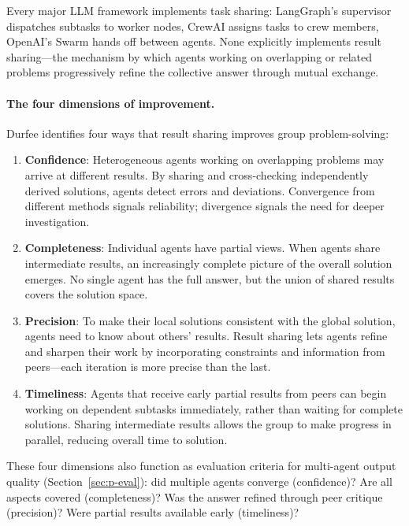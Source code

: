 \documentclass{article}
\begin{document}
Every major LLM framework implements task sharing: LangGraph's supervisor dispatches
subtasks to worker nodes, CrewAI assigns tasks to crew members, OpenAI's Swarm hands
off between agents. None explicitly implements result sharing---the mechanism by which
agents working on overlapping or related problems progressively refine the collective
answer through mutual exchange.

\paragraph{The four dimensions of improvement.}
Durfee identifies four ways that result sharing improves group problem-solving:

\begin{enumerate}[nosep]
  \item \textbf{Confidence}: Heterogeneous agents working on overlapping problems may
    arrive at different results. By sharing and cross-checking independently derived
    solutions, agents detect errors and deviations. Convergence from different methods
    signals reliability; divergence signals the need for deeper investigation.
  \item \textbf{Completeness}: Individual agents have partial views. When agents share
    intermediate results, an increasingly complete picture of the overall solution
    emerges. No single agent has the full answer, but the union of shared results
    covers the solution space.
  \item \textbf{Precision}: To make their local solutions consistent with the global
    solution, agents need to know about others' results. Result sharing lets agents
    refine and sharpen their work by incorporating constraints and information from
    peers---each iteration is more precise than the last.
  \item \textbf{Timeliness}: Agents that receive early partial results from peers can
    begin working on dependent subtasks immediately, rather than waiting for complete
    solutions. Sharing intermediate results allows the group to make progress in
    parallel, reducing overall time to solution.
\end{enumerate}

\noindent
These four dimensions also function as evaluation criteria for multi-agent output
quality (Section~\ref{sec:p-eval}): did multiple agents converge (confidence)? Are all
aspects covered (completeness)? Was the answer refined through peer critique (precision)?
Were partial results available early (timeliness)?
\end{document}
